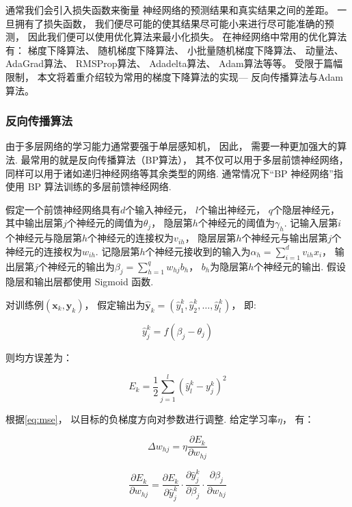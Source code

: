 通常我们会引入损失函数来衡量
神经网络的预测结果和真实结果之间的差距。
一旦拥有了损失函数，
我们便尽可能的使其结果尽可能小来进行尽可能准确的预测，
因此我们便可以使用优化算法来最小化损失。
在神经网络中常用的优化算法有：
梯度下降算法、
随机梯度下降算法、
小批量随机梯度下降算法、
动量法、
AdaGrad算法、
RMSProp算法、
Adadelta算法、
Adam算法等等。
受限于篇幅限制，
本文将着重介绍较为常用的梯度下降算法的实现---
反向传播算法与Adam算法。

\subsubsection{反向传播算法}

由于多层网络的学习能力通常要强于单层感知机，
因此，
需要一种更加强大的算法.
最常用的就是反向传播算法（BP算法），
其不仅可以用于多层前馈神经网络，
同样可以用于诸如递归神经网络等其余类型的网络.
通常情况下“BP 神经网络”指使用 BP 算法训练的多层前馈神经网络.

假定一个前馈神经网络具有$d$个输入神经元，
$l$个输出神经元，
$q$个隐层神经元，
其中输出层第$j$个神经元的阈值为$\theta_j$，
隐层第$h$个神经元的阈值为$\gamma_h$.
记输入层第$i$个神经元与隐层第$h$个神经元的连接权为$v_{ih}$，
隐层层第$h$个神经元与输出层第$j$个神经元的连接权为$w_{ih}$.
记隐层第$h$个神经元接收到的输入为$\alpha_h=\sum_{i=1}^dv_{ih}x_i$，
输出层第$j$个神经元的输出为$\beta_j=\sum_{h=1}^{q}{w_{hj}b_h}$，
$b_h$为隐层第$h$个神经元的输出.
假设隐层和输出层都使用 Sigmoid 函数.

对训练例$\left(\mathbf{x}_k, \mathbf{y}_k\right)$，
假定输出为$\hat{\mathbf{y}}_k=\left(\hat{y}_1^k, \hat{y}_2^k, \ldots, \hat{y}_l^k\right)$，
即:

\begin{equation}
    \label{eq:yjk}
    \hat{y}_j^k = f\left(\beta_j-\theta_j\right)
\end{equation}

则均方误差为：

\begin{equation}
    \label{eq:mse}
    E_k=\frac{1}{2}\sum_{j=1}^l{\left(\hat{y}_l^k-y_j^k\right)^2}
\end{equation}

根据\cref{eq:mse}，
以目标的负梯度方向对参数进行调整.
给定学习率$\eta$，
有：

\begin{equation}
    \Delta w_{hj}=\eta\frac{\partial{E_k}}{\partial{w_{hj}}}
\end{equation}

\begin{equation}
    \label{eq:partial}
    \frac{\partial{E_k}}{\partial{w_{hj}}}=\frac{\partial{E_k}}{\partial{\hat{y}_j^k}}\cdot\frac{\partial{\hat{y}_j^k}}{\partial{\beta_j}}\cdot\frac{\partial{\beta_j}}{\partial{w_{hj}}}
\end{equation}

